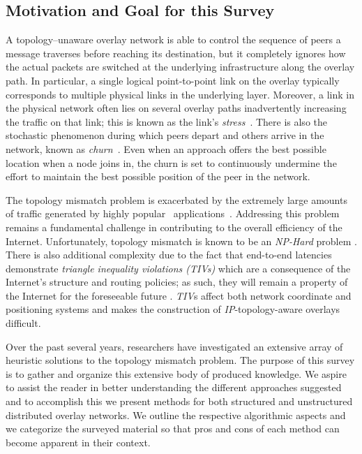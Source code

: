 \subsection{Motivation and Goal for this Survey}
A topology--unaware overlay network is able to control the sequence of peers a
message traverses before reaching its destination, but it completely ignores
how the actual packets are switched at the underlying infrastructure along
the overlay path. 
In particular, a single logical point-to-point link on the
overlay typically corresponds to multiple physical links in the
underlying layer. 
Moreover, a link in the physical network often lies
on several overlay paths inadvertently increasing the traffic on that
link; this is known as the link's \emph{stress}~\cite{CRSZ2002}. 
There is also the stochastic phenomenon during which peers 
depart and others arrive in the network, known 
as \emph{churn}~\cite{stutzbach_churn_2006}.
Even when an approach offers the best possible location
when a node joins in, the churn is set to  
continuously undermine the effort to maintain the best possible position
of the  peer in the network.

The topology mismatch problem is exacerbated by the extremely large amounts of
traffic generated by highly popular \p\ applications~\cite{byl-book}.
Addressing this problem remains a fundamental challenge 
in contributing to the overall efficiency of the Internet. 
Unfortunately, topology mismatch is known to be 
an \emph{NP-Hard} problem \cite{C2000,NPBOOK}. 
There is also additional complexity due to the fact that 
end-to-end latencies demonstrate \emph{triangle inequality
violations (TIVs)} which are a consequence of the Internet's structure and
routing policies; as such, they will remain a property of the Internet 
for the foreseeable future \cite{zheng_irprtt_2005}. 
\emph{TIV}s affect both network coordinate
\cite{cox_vivaldi_2004,WSS2005} and positioning \cite{ng_gnp_2001}
systems and makes the construction of \emph{IP}-topology-aware 
overlays difficult.

Over the past several years, researchers have investigated an extensive
array of heuristic solutions to the topology mismatch problem. 
The purpose of this survey is to gather and organize 
this extensive body of produced knowledge. 
We aspire to assist the reader in better understanding the 
different approaches suggested and to accomplish this we 
present methods for both structured and unstructured distributed 
overlay networks.
We outline the respective algorithmic aspects and we categorize
the surveyed material so that pros and cons of each method
can become apparent in their context.

